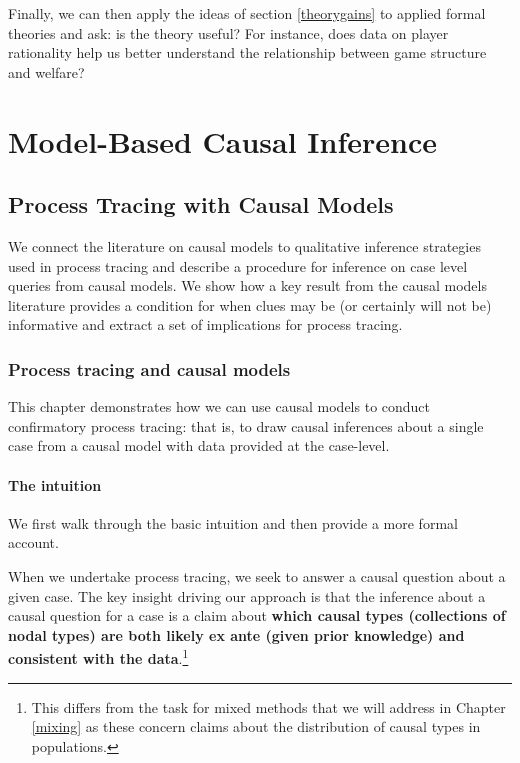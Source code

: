 \documentclass[
  12pt,
]{book}
\newenvironment{headerbox}{
  \definecolor{shadecolor}{rgb}{0.8, 0.8, 0.8}  %
  \color{black}
  \begin{shaded}}{\end{shaded}}
\begin{document}
Finally, we can then apply the ideas of section \ref{theorygains} to applied formal theories and ask: is the theory useful? For instance, does data on player rationality help us better understand the relationship between game structure and welfare?

\hypertarget{part-model-based-causal-inference}{%
\part{Model-Based Causal Inference}\label{part-model-based-causal-inference}}

\hypertarget{pt}{%
\chapter{Process Tracing with Causal Models}\label{pt}}

\begin{headerbox}
We connect the literature on causal models to qualitative inference strategies used in process tracing and describe a procedure for inference on case level queries from causal models. We show how a key result from the causal models literature provides a condition for when clues may be (or certainly will not be) informative and extract a set of implications for process tracing.

\end{headerbox}

\hypertarget{process-tracing-and-causal-models}{%
\section{Process tracing and causal models}\label{process-tracing-and-causal-models}}

This chapter demonstrates how we can use causal models to conduct confirmatory process tracing: that is, to draw causal inferences about a single case from a causal model with data provided at the case-level.

\hypertarget{the-intuition}{%
\subsection{The intuition}\label{the-intuition}}

We first walk through the basic intuition and then provide a more formal account.

When we undertake process tracing, we seek to answer a causal question about a given case.
The key insight driving our approach is that the inference about a causal question for a case is a claim about \textbf{which causal types (collections of nodal types) are both likely ex ante (given prior knowledge) and consistent with the data}.\footnote{This differs from the task for mixed methods that we will address in Chapter \ref{mixing} as these concern claims about the distribution of causal types in populations.}
\end{document}
